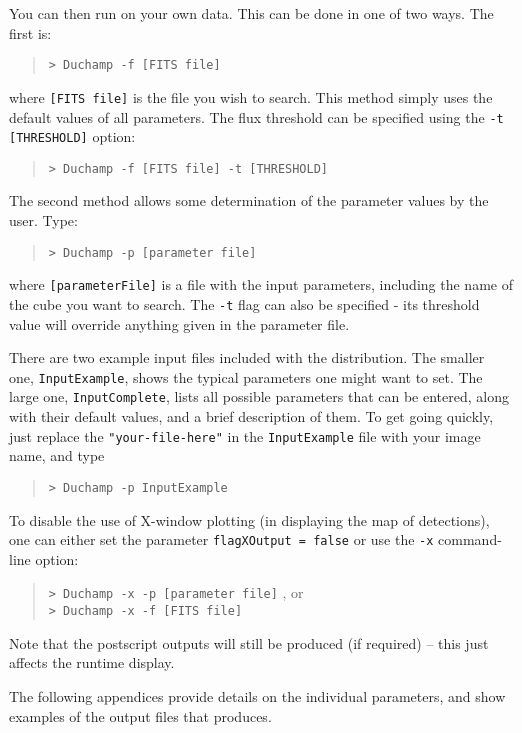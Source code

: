 You can then run \duchamp on your own data. This can be done in one
of two ways. The first is:
\begin{quote}
{\footnotesize
\texttt{> Duchamp -f [FITS file]}
}
\end{quote}
where \texttt{[FITS file]} is the file you wish to search. This method
simply uses the default values of all parameters. The flux threshold
can be specified using the \texttt{-t [THRESHOLD]} option:
\begin{quote}
{\footnotesize
\texttt{> Duchamp -f [FITS file] -t [THRESHOLD]}
}
\end{quote}

The second method allows some determination of the parameter values by
the user. Type:
\begin{quote}
{\footnotesize
\texttt{> Duchamp -p [parameter file]}
}
\end{quote}
where \texttt{[parameterFile]} is a file with the input parameters,
including the name of the cube you want to search. The \texttt{-t}
flag can also be specified - its threshold value will override
anything given in the parameter file.

There are two example input files included with the distribution. The
smaller one, \texttt{InputExample}, shows the typical parameters one
might want to set. The large one, \texttt{InputComplete}, lists all
possible parameters that can be entered, along with their default
values, and a brief description of them. To get going quickly, just
replace the \texttt{"your-file-here"} in the \texttt{InputExample}
file with your image name, and type
\begin{quote}
{\footnotesize
\texttt{> Duchamp -p InputExample}
}
\end{quote}

To disable the use of X-window plotting (in displaying the map of
detections), one can either set the parameter \texttt{flagXOutput =
false} or use the \texttt{-x} command-line option:
\begin{quote}
{\footnotesize
\texttt{> Duchamp -x -p [parameter file]}
}, or\\
{\footnotesize
\texttt{> Duchamp -x -f [FITS file]}
}
\end{quote}
Note that the postscript outputs will still be produced (if required)
-- this just affects the runtime display.

The following appendices provide details on the individual parameters,
and show examples of the output files that \duchamp produces.

